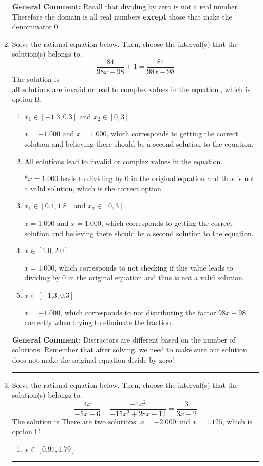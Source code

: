 \documentclass{extbook}[14pt]
\newcommand{\litem}[1]{\item #1

\rule{\textwidth}{0.4pt}}
\begin{document}
\begin{enumerate}
{\textbf{General Comment:} Recall that dividing by zero is not a real number. Therefore the domain is all real numbers \textbf{except} those that make the denominator 0.
}
\litem{
Solve the rational equation below. Then, choose the interval(s) that the solution(s) belongs to.
\[ \frac{84}{98x -98} + 1 = \frac{84}{98x -98} \]The solution is \( \text{all solutions are invalid or lead to complex values in the equation.} \), which is option B.\begin{enumerate}[label=\Alph*.]
\item \( x_1 \in [-1.3, 0.3] \text{ and } x_2 \in [0,3] \)

$x = -1.000 \text{ and } x = 1.000$, which corresponds to getting the correct solution and believing there should be a second solution to the equation.
\item \( \text{All solutions lead to invalid or complex values in the equation.} \)

*$x = 1.000$ leads to dividing by 0 in the original equation and thus is not a valid solution, which is the correct option.
\item \( x_1 \in [0.4, 1.8] \text{ and } x_2 \in [0,3] \)

$x = 1.000 \text{ and } x = 1.000$, which corresponds to getting the correct solution and believing there should be a second solution to the equation.
\item \( x \in [1.0,2.0] \)

$x = 1.000$, which corresponds to not checking if this value leads to dividing by 0 in the original equation and thus is not a valid solution.
\item \( x \in [-1.3,0.3] \)

$x = -1.000$, which corresponds to not distributing the factor $98x -98$ correctly when trying to eliminate the fraction.
\end{enumerate}

\textbf{General Comment:} Distractors are different based on the number of solutions. Remember that after solving, we need to make sure our solution does not make the original equation divide by zero!
}
\litem{
Solve the rational equation below. Then, choose the interval(s) that the solution(s) belongs to.
\[ \frac{4x}{-5x + 6} + \frac{-4x^{2}}{-15x^{2} +28 x -12} = \frac{3}{3x -2} \]The solution is \( \text{There are two solutions: } x = -2.000 \text{ and } x = 1.125 \), which is option C.\begin{enumerate}[label=\Alph*.]
\item \( x \in [0.97,1.79] \)



\end{enumerate}}
\end{enumerate}
\end{document}
